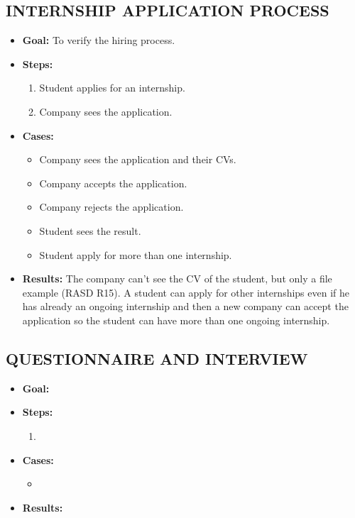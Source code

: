 \subsection{INTERNSHIP APPLICATION PROCESS}\label{subsec:internship-application-process}
\begin{itemize}
    \item \textbf{Goal:} To verify the hiring process.

    \item \textbf{Steps:}
    \begin{enumerate}
        \item Student applies for an internship.
        \item Company sees the application.
    \end{enumerate}
    \item \textbf{Cases:}
    \begin{itemize}
        \item Company sees the application and their CVs.
        \item Company accepts the application.
        \item Company rejects the application.
        \item Student sees the result.
        \item Student apply for more than one internship.
    \end{itemize}
    \item \textbf{Results:}
    The company can't see the CV of the student, but only a file example (RASD R15).
    A student can apply for other internships even if he has already an ongoing internship and then a new company can accept the application so the student can have more than one ongoing internship.

\end{itemize}

\subsection{QUESTIONNAIRE AND INTERVIEW}\label{subsec:questionnaire-and-interview}
\begin{itemize}
    \item \textbf{Goal:}

    \item \textbf{Steps:}
    \begin{enumerate}
        \item

    \end{enumerate}
    \item \textbf{Cases:}
    \begin{itemize}
        \item
    \end{itemize}
    \item \textbf{Results:}

\end{itemize}

